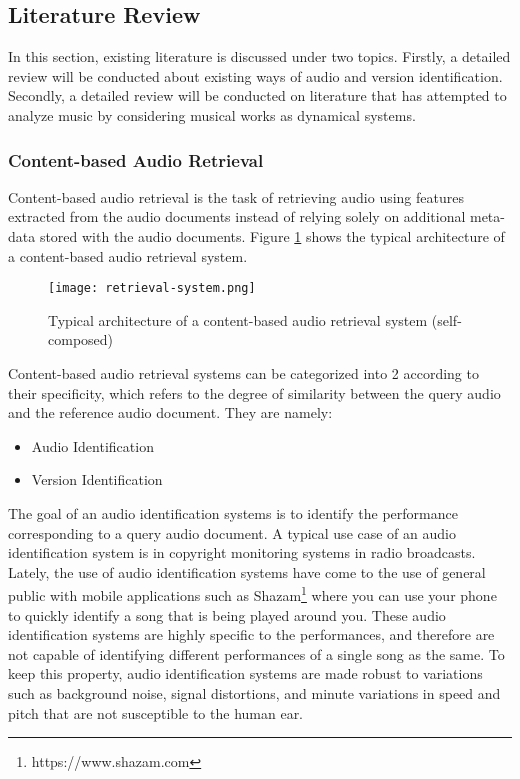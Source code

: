 \documentclass[../main.tex]{subfiles}
\begin{document}
\subsection{Literature Review}

In this section, existing literature is discussed under two topics. Firstly, a detailed review will be conducted about existing ways of audio and version identification. Secondly, a detailed review will be conducted on literature that has attempted to analyze music by considering musical works as dynamical systems. 

\subsubsection{Content-based Audio Retrieval}

\par
Content-based audio retrieval is the task of retrieving audio using features extracted from the audio documents instead of relying solely on additional meta-data stored with the audio documents. Figure \ref{fig:retrieval-system} shows the typical architecture of a content-based audio retrieval system.

\begin{figure}[H]
    \centering
    \texttt{[image: retrieval-system.png]}
    \caption{Typical architecture of a content-based audio retrieval system (self-composed)}
    \label{fig:retrieval-system}
\end{figure}

\par
Content-based audio retrieval systems can be categorized into 2 according to their specificity, which refers to the degree of similarity between the query audio and the reference audio document. They are namely:
\begin{itemize}
    \item Audio Identification
    \item Version Identification
\end{itemize}

\par
The goal of an audio identification systems is to identify the performance corresponding to a query audio document. A typical use case of an audio identification system is in copyright monitoring systems in radio broadcasts. Lately, the use of audio identification systems have come to the use of general public with mobile applications such as Shazam\footnote{https://www.shazam.com} where you can use your phone to quickly identify a song that is being played around you. These audio identification systems are highly specific to the performances, and therefore are not capable of identifying different performances of a single song as the same. To keep this property, audio identification systems are made robust to variations such as background noise, signal distortions, and minute variations in speed and pitch that are not susceptible to the human ear.
\end{document}
